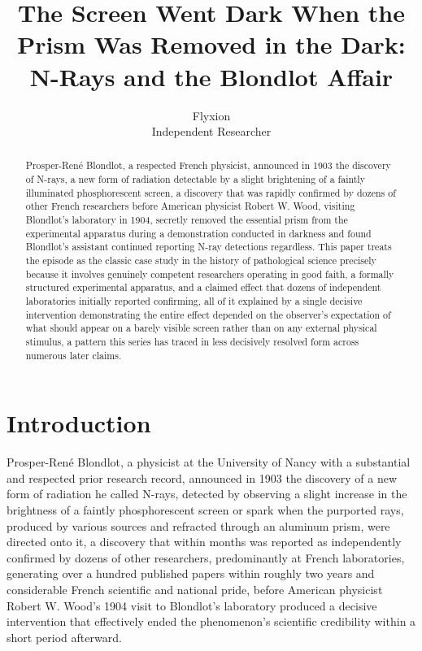\documentclass[11pt]{article}
\title{The Screen Went Dark When the Prism Was Removed in the Dark: N-Rays and the Blondlot Affair}
\author{Flyxion \\ \small Independent Researcher}
\date{}
\begin{document}
\maketitle

\begin{abstract}
Prosper-René Blondlot, a respected French physicist, announced in 1903 the discovery of N-rays, a new form of radiation detectable by a slight brightening of a faintly illuminated phosphorescent screen, a discovery that was rapidly confirmed by dozens of other French researchers before American physicist Robert W. Wood, visiting Blondlot's laboratory in 1904, secretly removed the essential prism from the experimental apparatus during a demonstration conducted in darkness and found Blondlot's assistant continued reporting N-ray detections regardless. This paper treats the episode as the classic case study in the history of pathological science precisely because it involves genuinely competent researchers operating in good faith, a formally structured experimental apparatus, and a claimed effect that dozens of independent laboratories initially reported confirming, all of it explained by a single decisive intervention demonstrating the entire effect depended on the observer's expectation of what should appear on a barely visible screen rather than on any external physical stimulus, a pattern this series has traced in less decisively resolved form across numerous later claims.
\end{abstract}

\section{Introduction}

Prosper-René Blondlot, a physicist at the University of Nancy with a substantial and respected prior research record, announced in 1903 the discovery of a new form of radiation he called N-rays, detected by observing a slight increase in the brightness of a faintly phosphorescent screen or spark when the purported rays, produced by various sources and refracted through an aluminum prism, were directed onto it, a discovery that within months was reported as independently confirmed by dozens of other researchers, predominantly at French laboratories, generating over a hundred published papers within roughly two years and considerable French scientific and national pride, before American physicist Robert W. Wood's 1904 visit to Blondlot's laboratory produced a decisive intervention that effectively ended the phenomenon's scientific credibility within a short period afterward.
\end{document}
